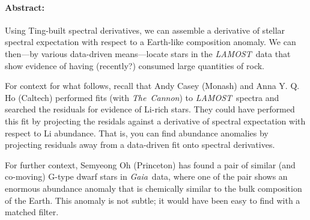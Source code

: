 \documentclass[12pt]{article}
\newcommand{\project}[1]{\textsl{#1}}
\newcommand{\acronym}[1]{{\small{#1}}}
\newcommand{\LAMOST}{\project{\acronym{LAMOST}}}
\newcommand{\TheCannon}{\project{The~Cannon}}
\newcommand{\Gaia}{\project{Gaia}}
\begin{document}
\raggedbottom\sloppy\sloppypar\frenchspacing

\paragraph{Abstract:}
Using Ting-built spectral derivatives,
we can assemble a derivative of stellar spectral expectation with respect
to a Earth-like composition anomaly.
We can then---by various data-driven means---locate stars in the
\LAMOST\ data that show evidence of having (recently?) consumed
large quantities of rock.

\bigskip

For context for what follows, recall that Andy Casey (Monash) and Anna
Y. Q. Ho (Caltech) performed fits (with \TheCannon) to
\LAMOST\ spectra and searched the residuals for evidence of
Li-rich stars.
They could have performed this fit by projecting the
residals against a derivative of spectral expectation with respect
to Li abundance.
That is, you can find abundance anomalies by projecting residuals away
from a data-driven fit onto spectral derivatives.

For further context, Semyeong Oh (Princeton) has found a pair of similar
(and co-moving) G-type dwarf stars in \Gaia\ data, where one of the pair
shows an enormous abundance anomaly that is chemically similar to the
bulk composition of the Earth.
This anomaly is not subtle; it would have been easy to find with a matched
filter.
\end{document}
